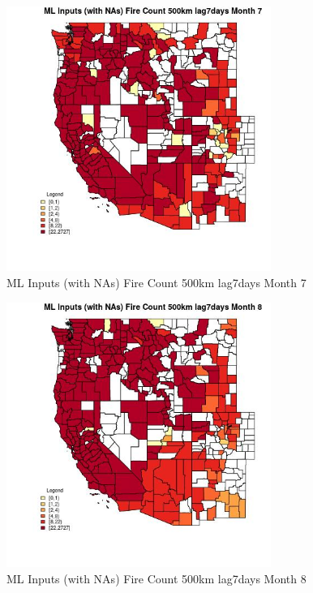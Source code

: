 \begin{figure} 
\centering  
\includegraphics[width=0.77\textwidth]{Code_Outputs/Report_ML_input_PM25_Step4_part_f_de_duplicated_aves_prioritize_24hr_obswNAs_CountyFire_Count_500km_lag7daysmedianMonth7.jpg} 
\caption{\label{fig:Report_ML_input_PM25_Step4_part_f_de_duplicated_aves_prioritize_24hr_obswNAsCountyFire_Count_500km_lag7daysmedianMonth7}ML Inputs (with NAs) Fire Count 500km lag7days Month 7} 
\end{figure} 
 

\begin{figure} 
\centering  
\includegraphics[width=0.77\textwidth]{Code_Outputs/Report_ML_input_PM25_Step4_part_f_de_duplicated_aves_prioritize_24hr_obswNAs_CountyFire_Count_500km_lag7daysmedianMonth8.jpg} 
\caption{\label{fig:Report_ML_input_PM25_Step4_part_f_de_duplicated_aves_prioritize_24hr_obswNAsCountyFire_Count_500km_lag7daysmedianMonth8}ML Inputs (with NAs) Fire Count 500km lag7days Month 8} 
\end{figure} 
 

